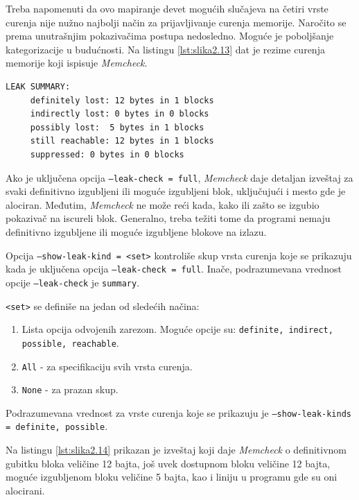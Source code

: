 \documentclass[12pt,oneside]{memoir}
\theoremstyle{plain}
\theoremstyle{definition}
\begin{document}
Treba napomenuti da ovo mapiranje devet mogućih slučajeva na četiri vrste curenja nije nužno najbolji način za prijavljivanje curenja memorije. Naročito se prema unutrašnjim pokazivačima postupa nedosledno. Moguće je poboljšanje kategorizacije u budućnosti. Na listingu  \ref{lst:slika2.13} dat je rezime curenja memorije koji ispisuje \textit{Memcheck}.


\begin{lstlisting}[style=terminal,caption={Rezime curenja memorije}, label={lst:slika2.13},language={bash}] 
LEAK SUMMARY: 
     definitely lost: 12 bytes in 1 blocks 
     indirectly lost: 0 bytes in 0 blocks
     possibly lost:  5 bytes in 1 blocks 
     still reachable: 12 bytes in 1 blocks
     suppressed: 0 bytes in 0 blocks
\end{lstlisting}

Ako je uključena opcija \texttt{--leak-check = full}, \textit{Memcheck} daje detaljan izveštaj za svaki definitivno izgubljeni ili moguće izgubljeni blok, uključujući i mesto gde je alociran. Međutim, \textit{Memcheck} ne može reći kada, kako ili zašto se izgubio pokazivač na iscureli blok. Generalno, treba težiti tome da programi nemaju definitivno izgubljene ili moguće izgubljene blokove na izlazu.

Opcija \texttt{--show-leak-kind = <set>} kontroliše skup vrsta curenja koje se prikazuju kada je uključena opcija \texttt{--leak-check = full}. Inače, podrazumevana vrednost opcije \texttt{–leak-check} je \texttt{summary}.

\texttt{<set>} se definiše na jedan od sledećih načina:
\begin{enumerate}
\item Lista opcija odvojenih zarezom. Moguće opcije su: \texttt{definite, indirect, possible, reachable}.
\item \texttt{All} - za specifikaciju svih vrsta curenja.
\item \texttt{None} -  za prazan skup.
\end{enumerate}
Podrazumevana vrednost za vrste curenja koje se prikazuju je \texttt{--show-leak-kinds = definite, possible}.

Na listingu \ref{lst:slika2.14} prikazan je izveštaj koji daje \textit{Memcheck} o definitivnom gubitku bloka veličine 12 bajta, još uvek dostupnom bloku veličine 12 bajta, moguće izgubljenom bloku veličine 5 bajta, kao i liniju u programu gde su oni alocirani. 
\end{document}
